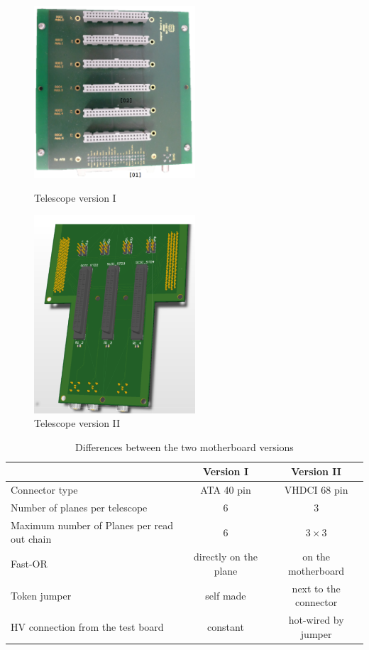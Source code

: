 \documentclass[british,11pt,a4paper]{memoir}
\begin{document}
\begin{figure}[t]
	\begin{minipage}{6cm}
		\includegraphics[width=6cm]{Telescope}
		\caption{Telescope version I}
		\label{p0}
	\end{minipage}
	\hfill
	\begin{minipage}{6cm}
		\includegraphics[width=6cm]{Telescope3DTop}
		\caption{Telescope version II}
		\label{p1}
	\end{minipage}
\end{figure}
\begin{table}[ht]
	\centering
	\begin{tabular}{p{4cm}|c|c}
										& Version I 			& Version II 					\\\hline\hline
		Connector type 					& ATA 40 pin 			& VHDCI 68 pin					\\\hline			
		Number of planes per telescope 	& $6$ 					& $3$							\\\hline
		Maximum number of Planes per read out chain		& $6$					& $3\times3$ \footnotemark[1] \\\hline
		Fast-OR							& directly on the plane	& on the motherboard			\\\hline
		Token jumper					& self made				& next to the connector	\\\hline
		HV connection from the test board	&  constant			& hot-wired by jumper
	\end{tabular}					
	\caption{Differences between the two motherboard versions}
	\label{t1}
\end{table}\no
\end{document}
